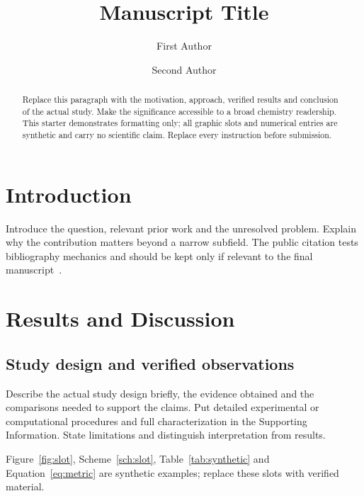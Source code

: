 \documentclass[serif,twocolumn]{prism-wiley-article}
\title{Manuscript Title}
\author[1]{First Author}
\author[1,2]{Second Author}
\affil[1]{Department, First institution, City, Postal code, Country}
\affil[2]{Department, Second institution, City, Postal code, Country}
\begin{document}
\begin{frontmatter}
\maketitle
\begin{abstract}
Replace this paragraph with the motivation, approach, verified results and
conclusion of the actual study. Make the significance accessible to a broad
chemistry readership. This starter demonstrates formatting only; all
graphic slots and numerical entries are synthetic and carry no scientific
claim. Replace every instruction before submission.
\end{abstract}
\end{frontmatter}

\section{Introduction}
Introduce the question, relevant prior work and the unresolved problem.
Explain why the contribution matters beyond a narrow subfield. The public
citation tests bibliography mechanics and should be kept only if relevant
to the final manuscript~\cite{wilkinson2016fair}.

\section{Results and Discussion}
\subsection{Study design and verified observations}
Describe the actual study design briefly, the evidence obtained and the
comparisons needed to support the claims. Put detailed experimental or
computational procedures and full characterization in the Supporting
Information. State limitations and distinguish interpretation from results.

Figure~\ref{fig:slot}, Scheme~\ref{sch:slot}, Table~\ref{tab:synthetic}
and Equation~\eqref{eq:metric} are synthetic examples; replace these slots
with verified material.
\end{document}
